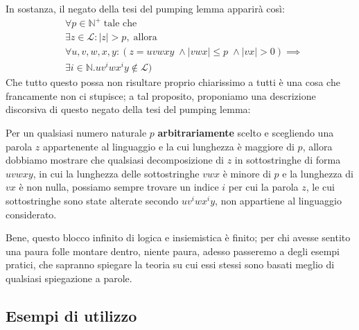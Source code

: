 \documentclass[class=book, crop=false, oneside, 12pt]{standalone}
\begin{document}
  In sostanza, il negato della tesi del pumping lemma apparirà così:
  \begin{align}
		&\forall p \in \mathbb{N}^+ \; \textrm{tale che} \label{eq:pl-neg_1} \\
		&\exists z \in \mathcal{L} : |z| > p,\; \textrm{allora} \label{eq:pl-neg_2} \\
		&\forall u, v, w, x, y : (z = uvwxy\; \land |vwx| \leq p \; \land |vx| > 0) \implies \label{eq:pl-neg_3} \\
		&\exists i \in \mathbb{N}.uv^iwx^iy \not\in \mathcal{L}) \label{eq:pl-neg_4}
  \end{align}
  Che tutto questo possa non risultare proprio chiarissimo a tutti è una cosa che francamente non ci stupisce; a tal proposito, proponiamo una descrizione discorsiva di questo negato della tesi del pumping lemma:
  \begin{displayquote}
    Per un qualsiasi numero naturale \(p\) \textbf{arbitrariamente} scelto e scegliendo una parola \(z\) appartenente al linguaggio e la cui lunghezza è maggiore di \(p\), allora dobbiamo mostrare che qualsiasi decomposizione di \(z\) in sottostringhe di forma \(uvwxy\), in cui la lunghezza delle sottostringhe \(vwx\) è minore di \(p\) e la lunghezza di \(vx\) è non nulla, possiamo sempre trovare un indice \(i\) per cui la parola \(z\), le cui sottostringhe sono state alterate secondo \(uv^iwx^iy\), non appartiene al linguaggio considerato.
  \end{displayquote}
  Bene, questo blocco infinito di logica e insiemistica è finito; per chi avesse sentito una paura folle montare dentro, niente paura, adesso passeremo a degli esempi pratici, che sapranno spiegare la teoria su cui essi stessi sono basati meglio di qualsiasi spiegazione a parole.

	\subsection{Esempi di utilizzo}
\end{document}
